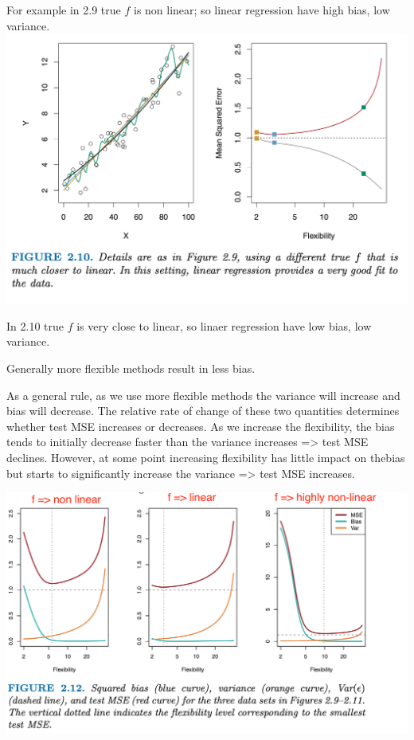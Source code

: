 \documentclass[
  letterpaper,
  DIV=11,
  numbers=noendperiod]{scrreprt}
\begin{document}
For example in 2.9 true \(f\) is non linear; so linear regression have
high bias, low variance. \includegraphics{fig2.10.png}

In 2.10 true \(f\) is very close to linear, so linaer regression have
low bias, low variance.

Generally more flexible methods result in less bias.

As a general rule, as we use more flexible methods the variance will
increase and bias will decrease. The relative rate of change of these
two quantities determines whether test MSE increases or decreases. As we
increase the flexibility, the bias tends to initially decrease faster
than the variance increases =\textgreater{} test MSE declines. However,
at some point increasing flexibility has little impact on thebias but
starts to significantly increase the variance =\textgreater{} test MSE
increases.

\includegraphics{fig2.12.png}
\end{document}
